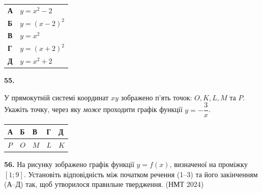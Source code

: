 \documentclass[14pt]{extarticle}
\newcommand{\answerTableTall}[5]{
\begin{center}
\begin{tabular}{|*{5}{>{\centering\arraybackslash}m{2.8cm}|}}
\hline
\rule[-0.3cm]{0pt}{0.8cm}\textbf{А} & \textbf{Б} & \textbf{В} & \textbf{Г} & \textbf{Д} \\
\hline
\rule[-0.9cm]{0pt}{2.0cm}#1 & 
\rule[-0.9cm]{0pt}{2.0cm}#2 & 
\rule[-0.9cm]{0pt}{2.0cm}#3 & 
\rule[-0.9cm]{0pt}{2.0cm}#4 & 
\rule[-0.9cm]{0pt}{2.0cm}#5 \\
\hline
\end{tabular}
\end{center}
}
\newcommand{\nmtyear}[1]{\hfill{\small\color{yearcolor}(НМТ #1)}}
\begin{document}
\vspace{0.3cm}
\begin{tabular}{ll}
    \textbf{А} & $y = x^2 - 2$ \\[0.2cm]
    \textbf{Б} & $y = (x - 2)^2$ \\[0.2cm]
    \textbf{В} & $y = x^2$ \\[0.2cm]
    \textbf{Г} & $y = (x + 2)^2$ \\[0.2cm]
    \textbf{Д} & $y = x^2 + 2$ \\
\end{tabular}

\vspace{0.7cm}

\noindent\textbf{55.} \begin{minipage}[t]{0.55\textwidth}
У прямокутній системі координат $xy$ зображено п'ять точок: $O, K, L, M$ та $P$. Укажіть точку, через яку \textit{може} проходити графік функції $y = -\dfrac{3}{x}$.
\end{minipage}
\hfill
\begin{minipage}[t]{0.4\textwidth}
    \vspace{-0.5cm}
    \begin{flushright}
    \end{flushright}
\end{minipage}

\vspace{0.3cm}
\answerTableTall{$P$}{$O$}{$M$}{$L$}{$K$}

\noindent\textbf{56.} На рисунку зображено графік функції $y=f(x)$, визначеної на проміжку $[1; 9]$. Установіть відповідність між початком речення (1--3) та його закінченням (А--Д) так, щоб утворилося правильне твердження. \nmtyear{2024}

\vspace{0.3cm}
\end{document}
